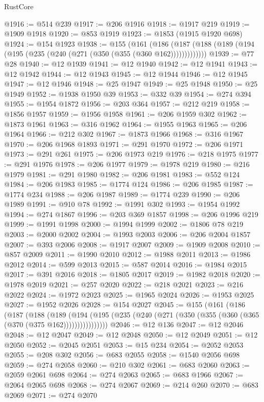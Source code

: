 \begin{lexlean}{RustCore}
\begin{coremodule}
@1916 := @514 @239
@1917 := @206 @1916
@1918 := @1917 @219
@1919 := @1909 @1918
@1920 := @853 @1919
@1923 := @1853 (@1915 @1920 @698)
@1924 := @154 @1923
@1938 := @155
    (@161 (@186 (@187 (@188 (@189 (@194 (@195 (@235 (@240 (@271 (@350 (@355 (@360 @162)))))))))))))
@1939 := @77 @28
@1940 := @12 @1939
@1941 := @12 @1940
@1942 := @12 @1941
@1943 := @12 @1942
@1944 := @12 @1943
@1945 := @12 @1944
@1946 := @12 @1945
@1947 := @12 @1946
@1948 := @25 @1947
@1949 := @25 @1948
@1950 := @25 @1949
@1952 := @1938 @1950 @39
@1953 := @332 @39
@1954 := @274 @394
@1955 := @1954 @1872
@1956 := @203 @364
@1957 := @212 @219
@1958 := @1856 @1957
@1959 := @1956 @1958
@1961 := @206 @1959 @302
@1962 := @1873 @1961
@1963 := @316 @1962
@1964 := @1955 @1963
@1965 := @206 @1964
@1966 := @212 @302
@1967 := @1873 @1966
@1968 := @316 @1967
@1970 := @206 @1968 @1893
@1971 := @291 @1970
@1972 := @206 @1971
@1973 := @291 @261
@1975 := @206 @1973 @219
@1976 := @218 @1975
@1977 := @291 @1976
@1978 := @206 @1977
@1979 := @1978 @219
@1980 := @216 @1979
@1981 := @291 @1980
@1982 := @206 @1981
@1983 := @552 @124
@1984 := @206 @1983
@1985 := @1774 @124
@1986 := @206 @1985
@1987 := @1774 @234
@1988 := @206 @1987
@1989 := @1774 @239
@1990 := @206 @1989
@1991 := @910 @78
@1992 := @1991 @302
@1993 := @1954 @1992
@1994 := @274 @1867
@1996 := @203 @369 @1857
@1998 := @206 @1996 @219
@1999 := @1991 @1998
@2000 := @1994 @1999
@2002 := @1806 @78 @219
@2003 := @2000 @2002
@2004 := @1993 @2003
@2006 := @206 @2004 @1857
@2007 := @393 @2006
@2008 := @1917 @2007
@2009 := @1909 @2008
@2010 := @857 @2009
@2011 := @1990 @2010
@2012 := @1988 @2011
@2013 := @1986 @2012
@2014 := @599 @2013
@2015 := @587 @2014
@2016 := @1984 @2015
@2017 := @391 @2016
@2018 := @1805 @2017
@2019 := @1982 @2018
@2020 := @1978 @2019
@2021 := @257 @2020
@2022 := @218 @2021
@2023 := @216 @2022
@2024 := @1972 @2023
@2025 := @1965 @2024
@2026 := @1953 @2025
@2027 := @1952 @2026
@2028 := @154 @2027
@2045 := @155
    (@161
      (@186
        (@187
          (@188
            (@189
              (@194 (@195 (@235 (@240 (@271 (@350 (@355 (@360 (@365 (@370 (@375 @162))))))))))))))))
@2046 := @12 @136
@2047 := @12 @2046
@2048 := @12 @2047
@2049 := @12 @2048
@2050 := @12 @2049
@2051 := @12 @2050
@2052 := @2045 @2051
@2053 := @15 @234
@2054 := @2052 @2053
@2055 := @208 @302
@2056 := @683 @2055
@2058 := @1540 @2056 @698
@2059 := @274 @2058
@2060 := @210 @302
@2061 := @683 @2060
@2063 := @2059 @2061 @698
@2064 := @274 @2063
@2065 := @683 @1966
@2067 := @2064 @2065 @698
@2068 := @274 @2067
@2069 := @214 @260
@2070 := @683 @2069
@2071 := @274 @2070

\end{coremodule}
\end{lexlean}
